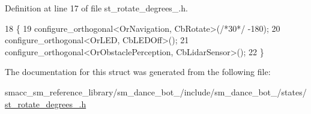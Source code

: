 Definition at line 17 of file st\+\_\+rotate\+\_\+degrees\+\_.\+h.


\begin{DoxyCode}
18   \{
19     configure\_orthogonal<OrNavigation, CbRotate>(\textcolor{comment}{/*30*/} -180);
20     configure\_orthogonal<OrLED, CbLEDOff>();
21     configure\_orthogonal<OrObstaclePerception, CbLidarSensor>();
22   \}
\end{DoxyCode}


The documentation for this struct was generated from the following file\+:\begin{DoxyCompactItemize}
\item 
smacc\+\_\+sm\+\_\+reference\+\_\+library/sm\+\_\+dance\+\_\+bot\+\_/include/sm\+\_\+dance\+\_\+bot\+\_/states/\hyperlink{3_2include_2sm__dance__bot__3_2states_2st__rotate__degrees__4_8h}{st\+\_\+rotate\+\_\+degrees\+\_.\+h}\end{DoxyCompactItemize}
